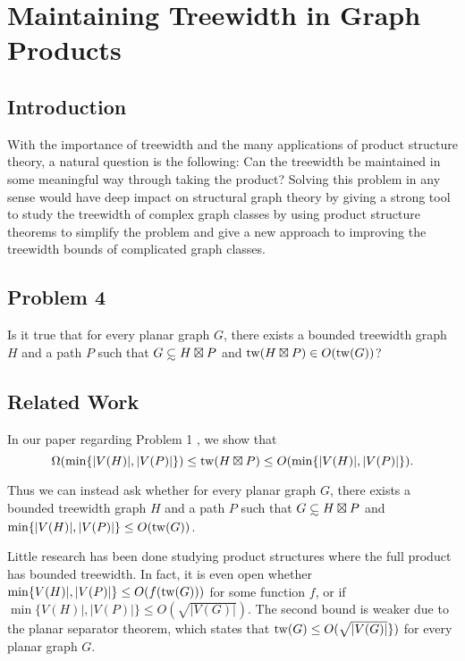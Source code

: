 \documentclass[../main.tex]{subfiles}
\begin{document}
	
	\section{Maintaining Treewidth in Graph Products}
	\subsection{Introduction}
	With the importance of treewidth and the many applications of product structure theory, a natural question is the following: Can the treewidth be maintained in some meaningful way through taking the product? Solving this problem in any sense would have deep impact on structural graph theory by giving a strong tool to study the treewidth of complex graph classes by using product structure theorems to simplify the problem and give a new approach to improving the treewidth bounds of complicated graph classes.
	\subsection{Problem 4}
	  Is it true that for every planar graph $G$, there exists a bounded treewidth graph $H$ and a path $P$ such that $G \subsetsim H\boxtimes P$ and $\operatorname{tw}(H\boxtimes P) \in O(\operatorname{tw}(G))$? 
	
	\subsection{Related Work}
	In our paper regarding Problem 1 \cite[Lemma~3, Equation~(2)]{DMWW24}, we show that $$\Omega(\min\{|V(H)|,|V(P)|\})\leq  \operatorname{tw}( H\boxtimes P) \leq O(\min\{|V(H)|,|V(P)|\}).$$ 
	
	Thus we can instead ask whether for every planar graph $G$, there exists a bounded treewidth graph $H$ and a path $P$ such that $G\subsetsim H\boxtimes P$ and $\min\{|V(H)|,|V(P)|\} \leq O(\operatorname{tw}(G))$. 
	
	Little research has been done studying product structures where the full product has bounded treewidth. In fact, it is even open whether $\min\{V(H)|,|V(P)|\} \leq O(f(\operatorname{tw}(G)))$ for some function $f$, or if $\min\{V(H)|,|V(P)|\} \leq O(\sqrt{|V(G)|})$. The second bound is weaker due to the planar separator theorem\cite{LT79}, which states that $\operatorname{tw}(G) \le O(\sqrt{|V(G)|}\})$ for every planar graph $G$.
	
	
	
\end{document}
